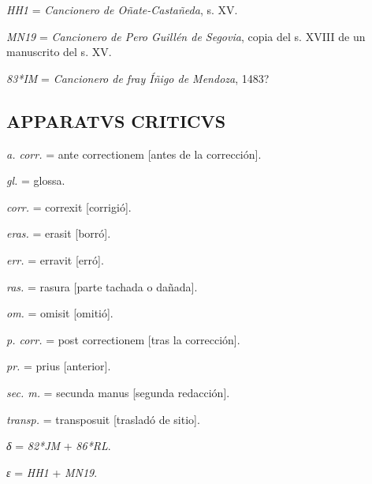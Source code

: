 \documentclass[11pt,a4paper,twoside]{article}
\begin{document}
\textit{HH1} = \textit{Cancionero de Oñate-Castañeda}, s. XV.

\textit{MN19} = \textit{Cancionero de Pero Guillén de Segovia}, copia del s. XVIII de un manuscrito del s. XV.

\textit{83*IM} = \textit{Cancionero de fray Íñigo de Mendoza}, 1483?

\subsection*{{\fontsize{11}{11.96}\selectfont APPARATVS CRITICVS}}

\textit{a. corr.} = ante correctionem [antes de la corrección].

\textit{gl.} = glossa.

\textit{corr.} = correxit [corrigió].

\textit{eras.} = erasit [borró].

\textit{err.} = erravit [erró].

\textit{ras.} = rasura [parte tachada o dañada].

\textit{om.} = omisit [omitió].

\textit{p. corr.} = post correctionem [tras la corrección].

\textit{pr.} = prius [anterior].

\textit{sec. m.} = secunda manus [segunda redacción].

\textit{transp.} = transposuit [trasladó de sitio].

\textit{δ} = \textit{82*JM} + \textit{86*RL}.

\textit{ε} = \textit{HH1} + \textit{MN19}.
\end{document}
